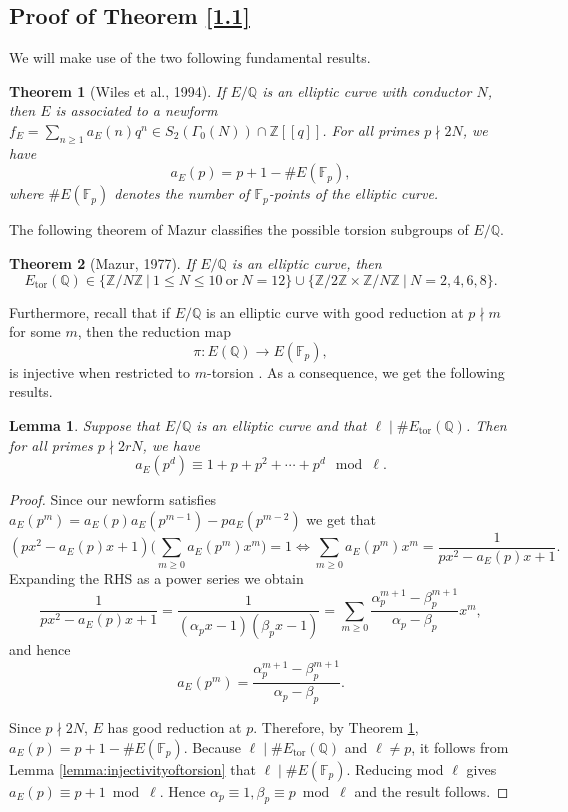 \documentclass[12pt]{amsart}
\newtheorem{thm}{Theorem}[section]
\newtheorem{lem}{Lemma}[section]
\newcommand{\Z}{\mathbb{Z}}
\newcommand{\Q}{\mathbb{Q}}
\newcommand{\F}{\mathbb{F}}
\newcommand{\tor}{\mathrm{tor}}
\numberwithin{equation}{section}
\begin{document}
\subsection{Proof of Theorem \ref{1.1}}

We will make use of the two following fundamental results.
\begin{thm}[Wiles et al., 1994]\label{Modularity}
If $E / \Q$ is an elliptic curve with conductor $N$, then $E$ is associated to a newform $f_E = \sum_{ n\geq 1} a_E(n) q^n \in S_2(\Gamma_0(N))\cap \Z[[q]]$. For all primes $p\nmid 2N$, we have
%
$$ a_E(p) = p+1 - \#E(\F_p), $$
%
where $\#E(\F_p)$ denotes the number of $\F_p$-points of the elliptic curve.
\end{thm}

The following theorem of Mazur classifies the possible torsion subgroups of $E/\Q$.
\begin{thm}[Mazur, 1977]{\label{Mazur}}
If $E/\Q$ is an elliptic curve, then $$E_{\tor}(\Q)\in \{\Z/N\Z\ |\ 1\le N\le 10\ \mathrm{or}\ N=12\}\cup\{\Z/2\Z \times \Z/N\Z \ |\ N=2,4,6,8\}.$$
\end{thm}
Furthermore, recall that if $E / \Q$ is an elliptic curve with good reduction at $p\nmid m$ for some $m$, then the reduction map 
\begin{equation}\label{lemma:injectivityoftorsion}
    \pi \colon E(\Q) \to E(\F_p),
\end{equation}
is injective when restricted to $m$-torsion \cite{Silverman}. As a consequence, we get the following results.
\begin{lem}\label{lemma1}\label{Initial congruence}
Suppose that $E / \Q$ is an elliptic curve and that $\ell\mid\#E_{\tor}(\Q)$. Then for all primes $p\nmid 2rN$, we have
%
$$a_E(p^d) \equiv 1+p+p^2+\cdots +p^d \mod \ell. $$
%
\end{lem}

\begin{proof}
Since our newform satisfies $a_E(p^m)=a_E(p)a_E(p^{m-1})-pa_E(p^{m-2})$ we get that 
$$(px^2-a_E(p)x+1)\Big(\sum_{m\geq0}a_E(p^m)x^m\Big)=1\iff \sum_{m\geq0}a_E(p^m)x^m=\frac{1}{px^2-a_E(p)x+1}.$$ Expanding the RHS as a power series we obtain $$\frac{1}{px^2-a_E(p)x+1}=\frac{1}{(\alpha_px-1)(\beta_px-1)}=\sum_{m\geq 0}\frac{\alpha_p^{m+1}-\beta_p^{m+1}}{\alpha_p-\beta_p}x^m,$$ and hence $$a_E(p^m)=\frac{\alpha_p^{m+1}-\beta_p^{m+1}}{\alpha_p-\beta_p}.$$


Since $p\nmid 2N$, $E$ has good reduction at $p$. Therefore, by Theorem \ref{Modularity}, $a_E(p)=p+1-\#E(\F_{p})$. Because $\ell\mid\#E_{\tor}(\Q)$ and $\ell \neq p$, it follows from Lemma \ref{lemma:injectivityoftorsion} that $\ell\mid\#E(\F_p)$. Reducing mod $\ell$ gives $a_E(p)\equiv p+1\bmod \ell$. Hence $\alpha_p\equiv 1,\beta_p\equiv p\bmod \ell$ and the result follows.
\end{proof}
\end{document}
